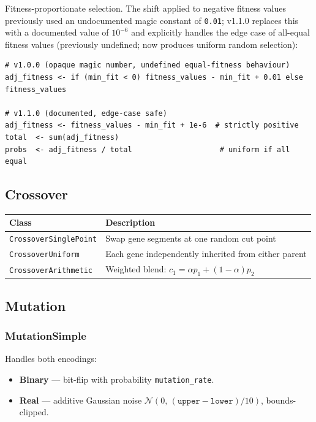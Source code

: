 \documentclass[11pt,a4paper]{article}
\begin{document}
Fitness-proportionate selection. The shift applied to negative fitness values
previously used an undocumented magic constant of \texttt{0.01}; v1.1.0
replaces this with a documented value of $10^{-6}$ and explicitly handles the
edge case of all-equal fitness values (previously undefined; now produces
uniform random selection):

\begin{lstlisting}
# v1.0.0 (opaque magic number, undefined equal-fitness behaviour)
adj_fitness <- if (min_fit < 0) fitness_values - min_fit + 0.01 else fitness_values

# v1.1.0 (documented, edge-case safe)
adj_fitness <- fitness_values - min_fit + 1e-6  # strictly positive
total  <- sum(adj_fitness)
probs  <- adj_fitness / total                    # uniform if all equal
\end{lstlisting}

\subsection{Crossover}

\begin{center}
\begin{tabular}{lp{8cm}}
  \toprule
  \textbf{Class} & \textbf{Description} \\
  \midrule
  \texttt{CrossoverSinglePoint} & Swap gene segments at one random cut point \\
  \texttt{CrossoverUniform}     & Each gene independently inherited from either parent \\
  \texttt{CrossoverArithmetic}  & Weighted blend: $c_1 = \alpha p_1 + (1-\alpha)p_2$ \\
  \bottomrule
\end{tabular}
\end{center}

\subsection{Mutation}

\subsubsection{MutationSimple}

Handles both encodings:

\begin{itemize}
  \item \textbf{Binary} --- bit-flip with probability \texttt{mutation\_rate}.
  \item \textbf{Real} --- additive Gaussian noise $\mathcal{N}(0,\,
    (\texttt{upper}-\texttt{lower})/10)$, bounds-clipped.
\end{itemize}
\end{document}
